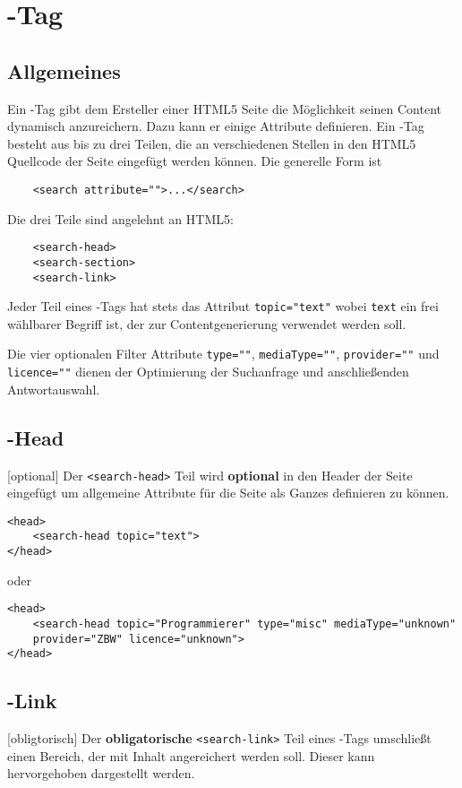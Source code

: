 \author{Gottfried von Recum}
\chapter{\SEARCH-Tag}

\section{Allgemeines}
Ein \SEARCH-Tag gibt dem Ersteller einer HTML5 Seite die Möglichkeit seinen Content dynamisch anzureichern. Dazu kann er einige Attribute definieren.
Ein \SEARCH-Tag besteht aus bis zu drei Teilen, die an verschiedenen Stellen in den HTML5 Quellcode der Seite eingefügt werden können.
Die generelle Form ist
\begin{lstlisting}
	<search attribute="">...</search>
\end{lstlisting}

Die drei Teile sind angelehnt an HTML5:
\begin{lstlisting}
	<search-head>
	<search-section>
	<search-link>
\end{lstlisting}

Jeder Teil eines \SEARCH-Tags hat stets das Attribut \Verb|topic="text"| wobei \Verb|text| ein frei wählbarer Begriff ist, der zur Contentgenerierung verwendet werden soll.

Die vier optionalen Filter Attribute \Verb|type=""|, \Verb|mediaType=""|, \Verb|provider=""| und \Verb|licence=""| dienen der Optimierung der Suchanfrage und anschließenden Antwortauswahl.

\section{\SEARCH-Head}
[optional]
Der \Verb|<search-head>| Teil wird \textbf{optional} in den Header der Seite eingefügt um allgemeine Attribute für die Seite als Ganzes definieren zu können.

\begin{lstlisting}
<head>
    <search-head topic="text">
</head>
\end{lstlisting}

oder

\begin{lstlisting}
<head>
    <search-head topic="Programmierer" type="misc" mediaType="unknown"
    provider="ZBW" licence="unknown">
</head>
\end{lstlisting}

\section{\SEARCH-Link}
[obligtorisch]
Der \textbf{obligatorische} \Verb|<search-link>| Teil eines \SEARCH-Tags umschließt einen Bereich, der mit Inhalt angereichert werden soll. Dieser kann hervorgehoben dargestellt werden.

